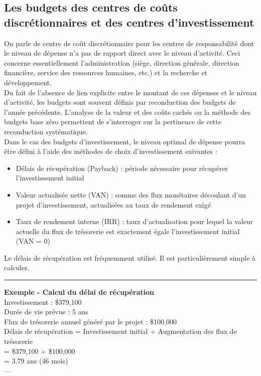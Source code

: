 \documentclass{kaobook}
\begin{document}
\subsection{Les budgets des centres de coûts discrétionnaires et des centres d'investissement}
\label{sec:orgd2faf70}
On parle de centre de coût discrétionnaire pour les centres de responsabilité dont le niveau de dépense n'a pas de rapport direct avec le niveau d'activité. Ceci concerne essentiellement l'administration (siège, direction générale, direction financière, service des ressources humaines, etc.) et la recherche et développement.\\
Du fait de l'absence de lien explicite entre le montant de ces dépenses et le niveau d'activité, les budgets sont souvent définis par reconduction des budgets de l'année précédente. L'analyse de la valeur et des coûts cachés ou la méthode des budgets base zéro permettent de s'interroger sur la pertinence de cette reconduction systématique.\\
Dans le cas des budgets d'investissement, le niveau optimal de dépense pourra être défini à l'aide des méthodes de choix d'investissement suivantes :\\
\begin{itemize}
\item Délais de récupération (Payback) : période nécessaire pour récupérer l'investissement initial\\
\item Valeur actualisée nette (VAN) : somme des flux monétaires découlant d’un projet d’investissement, actualisées au taux de rendement exigé\\
\item Taux de rendement interne (IRR) : taux d’actualisation  pour lequel la valeur actuelle du flux de trésorerie est exactement égale l'investissement initial  (VAN  = 0)\\
\end{itemize}

Le délais de récupération est fréquemment utilisé. Il est particulièrement simple à calculer.\\

\noindent\rule{\textwidth}{0.5pt}
\textbf{Exemple - Calcul du délai de récupération}\\
Investissement : \$379,100\\
Durée de vie prévue : 5  ans\\
Flux de trésorerie annuel généré par le projet : \$100,000\\
Délais de récupération = Investissement initial  ÷  Augmentation des flux de trésorerie\\
= \$379,100 ÷ \$100,000\\
= 3.79 ans (46 mois)\\
---\\
\end{document}
